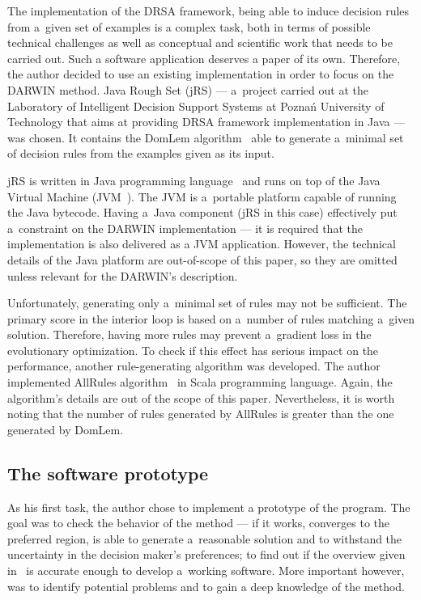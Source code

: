 The implementation of the DRSA framework, being able to induce decision rules
from a~given set of examples is a complex task, both in terms of possible
technical challenges as well as conceptual and scientific work that needs to
be carried out. Such a software application deserves a paper of its
own. Therefore, the author decided to use an existing implementation in order
to focus on the DARWIN method. Java Rough Set (jRS) --- a~project carried out
at the Laboratory of Intelligent Decision Support Systems at Poznań University
of Technology that aims at providing DRSA framework implementation in Java ---
was chosen. It contains the DomLem algorithm~\cite{GMS+01} able to generate
a~minimal set of decision rules from the examples given as its input.

jRS is written in Java programming language~\cite{Jav} and runs on top of the
Java Virtual Machine (JVM~\cite{LY99}). The JVM is a~portable platform capable
of running the Java bytecode. Having a~Java component (jRS in this case)
effectively put a~constraint on the DARWIN implementation --- it is required
that the implementation is also delivered as a JVM application. However, the
technical details of the Java platform are out-of-scope of this paper, so they
are omitted unless relevant for the DARWIN's description.

Unfortunately, generating only a~minimal set of rules may not be
sufficient. The primary score in the interior loop is based on a~number of
rules matching a~given solution. Therefore, having more rules may prevent
a~gradient loss in the evolutionary optimization. To check if this effect has
serious impact on the performance, another rule-generating algorithm was
developed. The author implemented AllRules algorithm~\cite{GMS+01b} in Scala
programming language. Again, the algorithm's details are out of the scope of
this paper. Nevertheless, it is worth noting that the number of rules
generated by AllRules is greater than the one generated by DomLem.

\subsection{The software prototype}

As his first task, the author chose to implement a prototype of the
program. The goal was to check the behavior of the method --- if it works,
converges to the preferred region, is able to generate a~reasonable solution
and to withstand the uncertainty in the decision maker's preferences; to find
out if the overview given in~\cite{GMS10, GMS10b, GMS10c} is accurate enough
to develop a~working software. More important however, was to identify
potential problems and to gain a deep knowledge of the method.

